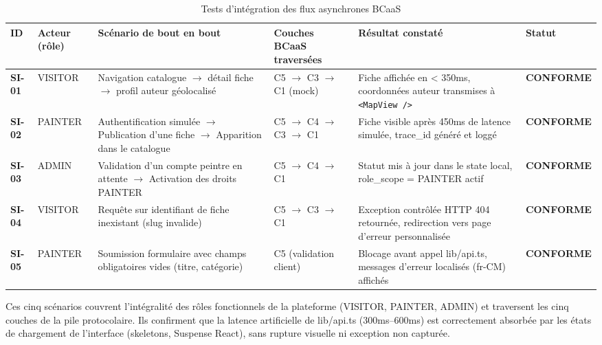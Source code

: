 \documentclass[12pt,a4paper]{report}
\begin{document}
\begin{table}[H]
\centering
\caption{Tests d'intégration des flux asynchrones BCaaS}
\label{tab:integration_tests}
\renewcommand{\arraystretch}{1.4}
\small
\begin{tabular}{|p{}|p{}|p{}|p{}|p{}|p{}|}
\hline
\textbf{ID} & \textbf{Acteur (rôle)} & \textbf{Scénario de bout en bout} & \textbf{Couches BCaaS traversées} & \textbf{Résultat constaté} & \textbf{Statut} \\
\hline
\textbf{SI-01} & VISITOR & Navigation catalogue $\rightarrow$ détail fiche $\rightarrow$ profil auteur géolocalisé & C5 $\rightarrow$ C3 $\rightarrow$ C1 (mock) & Fiche affichée en < 350ms, coordonnées auteur transmises à \texttt{<MapView />} & \textbf{CONFORME} \\
\hline
\textbf{SI-02} & PAINTER & Authentification simulée $\rightarrow$ Publication d'une fiche $\rightarrow$ Apparition dans le catalogue & C5 $\rightarrow$ C4 $\rightarrow$ C3 $\rightarrow$ C1 & Fiche visible après 450ms de latence simulée, trace\_id généré et loggé & \textbf{CONFORME} \\
\hline
\textbf{SI-03} & ADMIN & Validation d'un compte peintre en attente $\rightarrow$ Activation des droits PAINTER & C5 $\rightarrow$ C4 $\rightarrow$ C1 & Statut mis à jour dans le state local, role\_scope = PAINTER actif & \textbf{CONFORME} \\
\hline
\textbf{SI-04} & VISITOR & Requête sur identifiant de fiche inexistant (slug invalide) & C5 $\rightarrow$ C3 $\rightarrow$ C1 & Exception contrôlée HTTP 404 retournée, redirection vers page d'erreur personnalisée & \textbf{CONFORME} \\
\hline
\textbf{SI-05} & PAINTER & Soumission formulaire avec champs obligatoires vides (titre, catégorie) & C5 (validation client) & Blocage avant appel lib/api.ts, messages d'erreur localisés (fr-CM) affichés & \textbf{CONFORME} \\
\hline
\end{tabular}
\end{table}

Ces cinq scénarios couvrent l'intégralité des rôles fonctionnels de la plateforme (VISITOR, PAINTER, ADMIN) et traversent les cinq couches de la pile protocolaire. Ils confirment que la latence artificielle de lib/api.ts (300ms--600ms) est correctement absorbée par les états de chargement de l'interface (skeletons, Suspense React), sans rupture visuelle ni exception non capturée.
\end{document}
